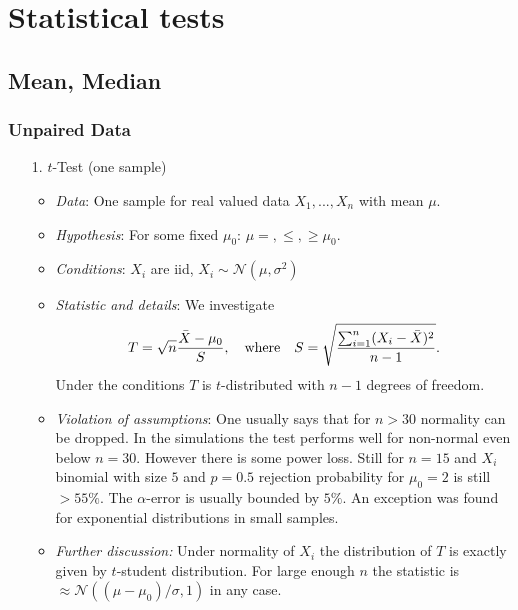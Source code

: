 \documentclass[12pt,a4paper]{amsart}
\theoremstyle{definition}
\theoremstyle{remark}
\numberwithin{equation}{section}
\begin{document}
\section{Statistical tests}


\subsection{Mean, Median}

\subsubsection{Unpaired Data}

\begin{itemize}
\item[1.] $t$-Test (one sample)
\begin{itemize}
\item \textit{Data}:  One sample for real valued data $X_1,...,X_n$ with mean $\mu$.
\item \textit{Hypothesis}: For some fixed $\mu_0$: $\mu =, \le, \ge \mu_0$. 
\item \textit{Conditions}: $X_i$ are iid, $X_i \sim \mathcal{N}(\mu, \sigma^2)$
\item \textit{Statistic and details}: We investigate
$$T= \sqrt{n}\frac{\bar{X}-\mu_0}{S}, \quad \textnormal{where} \quad S=\sqrt{\frac{\sum_{i=1}^n (X_i-\bar{X})^2}{n-1}}.$$
Under the conditions $T$ is $t$-distributed with $n-1$ degrees of freedom. 
\item \textit{Violation of assumptions}:
One usually says that for $n>30$ normality can be dropped. In the simulations the test performs well for non-normal even below $n=30$. However there is some power loss. Still for $n=15$ and $X_i$ binomial with size $5$ and $p=0.5$ rejection probability for $\mu_0=2$ is still $>55\%$.  The $\alpha$-error is usually bounded by $5\%$. An exception was found for exponential distributions in small samples.
\item \textit{Further discussion:} Under normality of $X_i$ the distribution of $T$ is exactly given by $t$-student distribution. For large enough $n$ the statistic is $\approx \mathcal{N}((\mu-\mu_0)/\sigma, 1)$ in any case. \\
\end{itemize}


\end{itemize}
\end{document}
